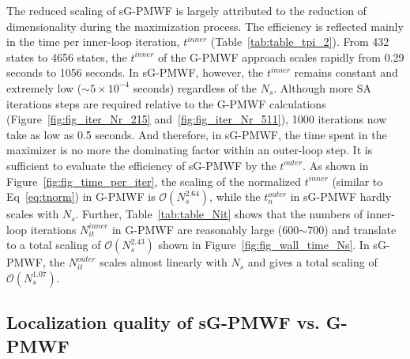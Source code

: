 \documentclass[journal=jacsat,manuscript=article]{achemso}
\begin{document}
The reduced scaling of sG-PMWF is largely attributed to the reduction of dimensionality during the maximization process. The efficiency is reflected mainly in the time per inner-loop iteration, $t^{inner}$ (Table~\ref{tab:table_tpi_2}). From 432 states to 4656 states, the $t^{inner}$ of the G-PMWF approach scales rapidly from 0.29 seconds to 1056 seconds. In sG-PMWF, however, the $t^{inner}$ remains constant and extremely low ($\sim5\times 10^{-4}$ seconds) regardless of the $N_s$. Although more SA iterations steps are required relative to the G-PMWF calculations (Figure~\ref{fig:fig_iter_Nr_215} and~\ref{fig:fig_iter_Nr_511}), 1000 iterations now take as low as 0.5 seconds. And therefore, in sG-PMWF, the time spent in the maximizer is no more the dominating factor within an outer-loop step. It is sufficient to evaluate the efficiency of sG-PMWF by the $t^{outer}$. As shown in Figure~\ref{fig:fig_time_per_iter}, the scaling of the normalized $t^{inner}$ (similar to Eq~\eqref{eq:tnorm}) in G-PMWF is $\mathcal{O}(N_s^{2.64})$, while the $t^{outer}_n$ in sG-PMWF hardly scales with $N_s$. Further, Table~\ref{tab:table_Nit} shows that the numbers of inner-loop iterations $N_{it}^{inner}$ in G-PMWF are reasonably large (600$\sim$700) and translate to a total scaling of $\mathcal{O}(N_s^{2.43})$ shown in Figure~\ref{fig:fig_wall_time_Ns}. In sG-PMWF, the $N_{it}^{outer}$ scales almost linearly with $N_s$ and gives a total scaling of $\mathcal{O}(N_s^{1.07})$. 

\subsection{Localization quality of sG-PMWF vs. G-PMWF}
\end{document}
